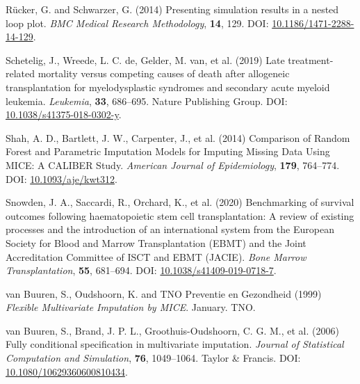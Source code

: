 \documentclass[
  letterpaper,
  DIV=11,
  numbers=noendperiod]{scrreprt}
\newlength{\cslhangindent}
\newlength{\cslentryspacingunit} %
\newenvironment{CSLReferences}[2] %
 {%
  \setlength{\parindent}{0pt}
  \ifodd #1
  \let\oldpar\par
  \def\par{\hangindent=\cslhangindent\oldpar}
  \fi
  \setlength{\parskip}{#2\cslentryspacingunit}
 }%
 {}
\begin{document}
\begin{CSLReferences}{1}{0}
\leavevmode{}%
Rücker, G. and Schwarzer, G. (2014) Presenting simulation results in a
nested loop plot. \emph{BMC Medical Research Methodology}, \textbf{14},
129. DOI:
\href{https://doi.org/10.1186/1471-2288-14-129}{10.1186/1471-2288-14-129}.

\leavevmode{}%
Schetelig, J., Wreede, L. C. de, Gelder, M. van, et al. (2019) Late
treatment-related mortality versus competing causes of death after
allogeneic transplantation for myelodysplastic syndromes and secondary
acute myeloid leukemia. \emph{Leukemia}, \textbf{33}, 686--695. Nature
Publishing Group. DOI:
\href{https://doi.org/10.1038/s41375-018-0302-y}{10.1038/s41375-018-0302-y}.

\leavevmode{}%
Shah, A. D., Bartlett, J. W., Carpenter, J., et al. (2014) Comparison of
{Random Forest} and {Parametric Imputation Models} for {Imputing Missing
Data Using MICE}: {A CALIBER Study}. \emph{American Journal of
Epidemiology}, \textbf{179}, 764--774. DOI:
\href{https://doi.org/10.1093/aje/kwt312}{10.1093/aje/kwt312}.

\leavevmode{}%
Snowden, J. A., Saccardi, R., Orchard, K., et al. (2020) Benchmarking of
survival outcomes following haematopoietic stem cell transplantation:
{A} review of existing processes and the introduction of an
international system from the {European Society} for {Blood} and {Marrow
Transplantation} ({EBMT}) and the {Joint Accreditation Committee} of
{ISCT} and {EBMT} ({JACIE}). \emph{Bone Marrow Transplantation},
\textbf{55}, 681--694. DOI:
\href{https://doi.org/10.1038/s41409-019-0718-7}{10.1038/s41409-019-0718-7}.

\leavevmode{}%
van Buuren, S., Oudshoorn, K. and TNO Preventie en Gezondheid (1999)
\emph{Flexible {Multivariate Imputation} by {MICE}}. January. TNO.

\leavevmode{}%
van Buuren, S., Brand, J. P. L., Groothuis-Oudshoorn, C. G. M., et al.
(2006) Fully conditional specification in multivariate imputation.
\emph{Journal of Statistical Computation and Simulation}, \textbf{76},
1049--1064. Taylor \& Francis. DOI:
\href{https://doi.org/10.1080/10629360600810434}{10.1080/10629360600810434}.


\end{CSLReferences}
\end{document}
